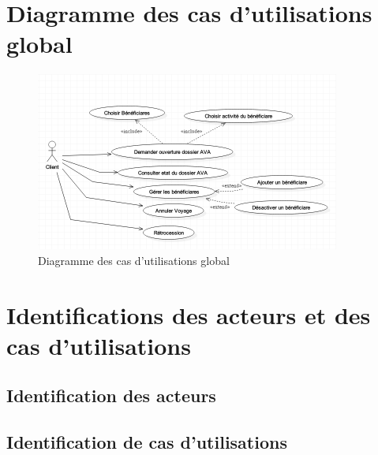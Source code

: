  \section{Diagramme des cas d'utilisations global}
 
 \begin{figure}[!h]
\begin{center}

\includegraphics[width=10cm]{./conception/Global_use_case}

\caption{Diagramme des cas d'utilisations global}
\end{center}
\end{figure}

 
 \section{Identifications des acteurs et des cas d'utilisations}
 
 \subsection{Identification des acteurs}
 
 \subsection{Identification de cas d'utilisations}
 